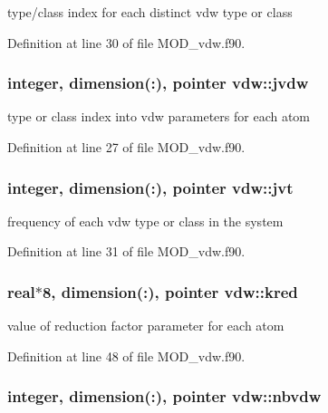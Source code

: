 type/class index for each distinct vdw type or class 



Definition at line 30 of file M\-O\-D\-\_\-vdw.\-f90.

\hypertarget{classvdw_a313a6e8af39ceff2753ec10da53ccde9}{
\subsubsection[{jvdw}]{\setlength{\rightskip}{0pt plus 5cm}integer, dimension(\-:), pointer vdw\-::jvdw}}\label{classvdw_a313a6e8af39ceff2753ec10da53ccde9}


type or class index into vdw parameters for each atom 



Definition at line 27 of file M\-O\-D\-\_\-vdw.\-f90.

\hypertarget{classvdw_a6ea1e02bcc0603c5869ca4da25ddc75c}{
\subsubsection[{jvt}]{\setlength{\rightskip}{0pt plus 5cm}integer, dimension(\-:), pointer vdw\-::jvt}}\label{classvdw_a6ea1e02bcc0603c5869ca4da25ddc75c}


frequency of each vdw type or class in the system 



Definition at line 31 of file M\-O\-D\-\_\-vdw.\-f90.

\hypertarget{classvdw_ad85a1ffa2bf6310e38c7a3fd6ac8256b}{
\subsubsection[{kred}]{\setlength{\rightskip}{0pt plus 5cm}real$\ast$8, dimension(\-:), pointer vdw\-::kred}}\label{classvdw_ad85a1ffa2bf6310e38c7a3fd6ac8256b}


value of reduction factor parameter for each atom 



Definition at line 48 of file M\-O\-D\-\_\-vdw.\-f90.

\hypertarget{classvdw_a1682072bec44b47fdbeb05fe438b1167}{
\subsubsection[{nbvdw}]{\setlength{\rightskip}{0pt plus 5cm}integer, dimension(\-:), pointer vdw\-::nbvdw}}\label{classvdw_a1682072bec44b47fdbeb05fe438b1167}


